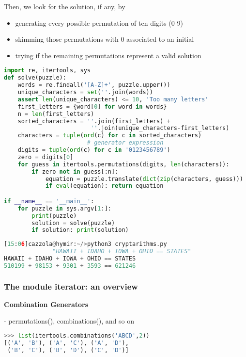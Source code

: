 Then, we look for the solution, if any, by
\begin{itemize}
	\item generating every possible permutation of ten digits (0-9)
	\item skimming those permutations with 0 associated to an initial
	\item  trying if the remaining permutations represent a valid solution
\end{itemize}

\begin{lstlisting}[language=Python]
import re, itertools, sys
def solve(puzzle):
	words = re.findall('[A-Z]+', puzzle.upper())
	unique_characters = set(''.join(words))
	assert len(unique_characters) <= 10, 'Too many letters'
	first_letters = {word[0] for word in words}
	n = len(first_letters)
	sorted_characters = ''.join(first_letters) + 
						 ''.join(unique_characters-first_letters)
	characters = tuple(ord(c) for c in sorted_characters) 
	                    # generator expression
	digits = tuple(ord(c) for c in '0123456789')
	zero = digits[0]
	for guess in itertools.permutations(digits, len(characters)):
		if zero not in guess[:n]:
			equation = puzzle.translate(dict(zip(characters, guess)))
			if eval(equation): return equation

if __name__ == '__main__':
	for puzzle in sys.argv[1:]:
		print(puzzle)
		solution = solve(puzzle)
		if solution: print(solution)
\end{lstlisting}

\begin{lstlisting}[language=Python]
[15:06]cazzola@hymir:~/>python3 cryptarithms.py 
              "HAWAII + IDAHO + IOWA + OHIO == STATES"
HAWAII + IDAHO + IOWA + OHIO == STATES
510199 + 98153 + 9301 + 3593 == 621246
\end{lstlisting}

\subsubsection{The module iterator: an overview}

\textbf{Combination Generators}

- permutations(), combinations(), and so on

\begin{lstlisting}[language=Python]
>>> list(itertools.combinations('ABCD',2))
[('A', 'B'), ('A', 'C'), ('A', 'D'), 
 ('B', 'C'), ('B', 'D'), ('C', 'D')]
\end{lstlisting}

